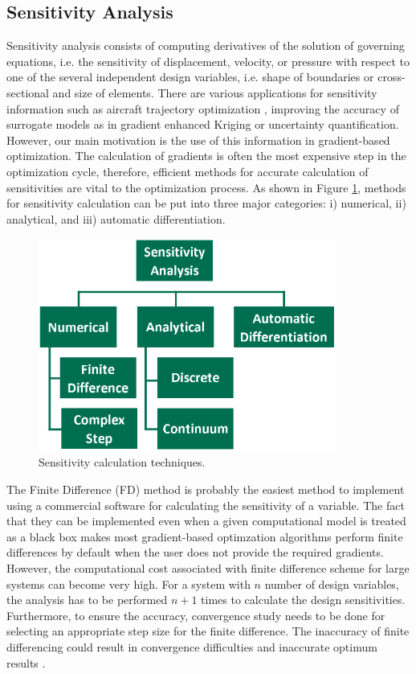 \subsection{Sensitivity Analysis}
Sensitivity analysis consists of computing derivatives of the solution of governing equations, i.e. the sensitivity of displacement, velocity, or pressure with respect to one of the several independent design variables, i.e. shape of boundaries or cross-sectional and size of elements. There are various applications for sensitivity information such as aircraft trajectory optimization \cite{sridhar2011aircraft}, improving the accuracy of surrogate models as in gradient enhanced Kriging \cite{han2013improving} or uncertainty quantification\cite{pettit2004uncertainty}. However, our main motivation is the use of this information in gradient-based optimization. The calculation of gradients is often the most expensive step in the optimization cycle, therefore, efficient methods for accurate calculation of sensitivities are vital to the optimization process. As shown in Figure \ref{fig:C1_sensitivityTaxonomy}, methods for sensitivity calculation can be put into three major categories: i) numerical, ii) analytical, and iii) automatic differentiation.
%
\begin{figure}[H]
	\centering
	\includegraphics[height=7.00cm]{Chapter_1/figure/sensitivity_taxonomy.png}
	\caption{Sensitivity calculation techniques.}
	\label{fig:C1_sensitivityTaxonomy}
\end{figure}
%
The Finite Difference (FD) method is probably the easiest method to implement using a commercial software for calculating the sensitivity of a variable. The fact that they can be implemented even when a given computational model is treated as a black box makes most gradient-based optimzation algorithms perform finite differences by default when the user does not provide the required gradients. However, the computational cost associated with finite difference scheme for large systems can become very high. For a system with $n$ number of design variables, the analysis has to be performed $n+1$ times to calculate the design sensitivities. Furthermore, to ensure the accuracy, convergence study needs to be done for selecting an appropriate step size for the finite difference. The inaccuracy of finite differencing could result in convergence difficulties and inaccurate optimum results \cite{sobieszczanski1997multidisciplinary}.

